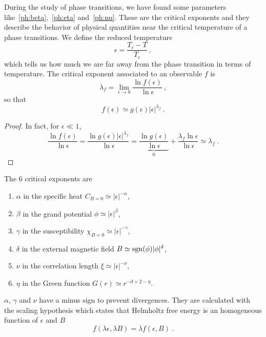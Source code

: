     During the study of phase transitions, we have found some parameters like~\eqref{ph:beta},~\eqref{ph:eta} and~\eqref{ph:nu}. These are the critical exponents and they describe the behavior of physical quantities near the critical temperature of a phase transitions. We define the reduced temperature 
    \begin{equation*}
        \epsilon = \frac{T_c - T}{T_c} ~,
    \end{equation*}
    which tells us how much we are far away from the phase transition in terms of temperature. The critical exponent associated to an observable $f$ is 
    \begin{equation*}
        \lambda_f = \lim_{\epsilon \rightarrow 0} \frac{\ln f(\epsilon)}{\ln \epsilon} ~,
    \end{equation*}
    so that 
    \begin{equation*}
        f (\epsilon) \simeq g(\epsilon) |\epsilon|^{\lambda_f} ~.
    \end{equation*}
    \begin{proof}
        In fact, for $\epsilon \ll 1$,
        \begin{equation*}
            \frac{\ln f(\epsilon)}{\ln \epsilon} = \frac{\ln g(\epsilon) |\epsilon|^{\lambda_f}}{\ln \epsilon} = \underbrace{\frac{\ln g(\epsilon)}{\ln \epsilon}}_0 + \frac{\lambda_f \ln \epsilon}{\ln \epsilon} \simeq \lambda_f ~.
        \end{equation*}
    \end{proof}
    
    The $6$ critical exponents are
    \begin{enumerate}
        \item $\alpha$ in the specific heat $C_{B = 0} \simeq |\epsilon|^{-\alpha}$,
        \item $\beta$ in the grand potential $\phi \simeq |\epsilon|^{\beta}$,
        \item $\gamma$ in the susceptibility $\chi_{B = 0} \simeq |\epsilon|^{-\gamma}$,
        \item $\delta$ in the external magnetic field $B \simeq \operatorname{sgn}(\phi) |\phi|^{\delta}$,
        \item $\nu$ in the correlation length $\xi \simeq |\epsilon|^{-\nu}$,
        \item $\eta$ in the Green function $G(r) \simeq r^{-d+2-\eta}$.
    \end{enumerate}
    $\alpha$, $\gamma$ and $\nu$ have a minus sign to prevent divergences. They are calculated with the scaling hypothesis which states that Helmholtz free energy is an homogeneous function of $\epsilon$ and $B$ 
    \begin{equation*}
        f ( \lambda \epsilon, \lambda B) = \lambda f(\epsilon, B) ~.
    \end{equation*}

